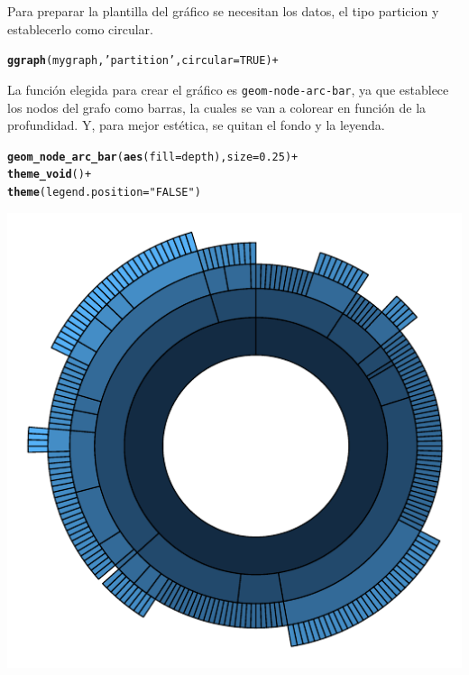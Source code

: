 \documentclass{article}\usepackage[]{graphicx}\usepackage[]{color}
\makeatletter
\def\maxwidth{ %
  \ifdim\Gin@nat@width>\linewidth
    \linewidth
  \else
    \Gin@nat@width
  \fi
}
\newcommand{\hlnum}[1]{\textcolor[rgb]{0.686,0.059,0.569}{#1}}%
\newcommand{\hlstr}[1]{\textcolor[rgb]{0.192,0.494,0.8}{#1}}%
\newcommand{\hlopt}[1]{\textcolor[rgb]{0,0,0}{#1}}%
\newcommand{\hlstd}[1]{\textcolor[rgb]{0.345,0.345,0.345}{#1}}%
\newcommand{\hlkwc}[1]{\textcolor[rgb]{0.333,0.667,0.333}{#1}}%
\newcommand{\hlkwd}[1]{\textcolor[rgb]{0.737,0.353,0.396}{\textbf{#1}}}%
\newenvironment{kframe}{%
 \def\at@end@of@kframe{}%
 \ifinner\ifhmode%
  \def\at@end@of@kframe{\end{minipage}}%
  \begin{minipage}{\columnwidth}%
 \fi\fi%
 \def\FrameCommand##1{\hskip\@totalleftmargin \hskip-\fboxsep
 \colorbox{shadecolor}{##1}\hskip-\fboxsep
     \hskip-\linewidth \hskip-\@totalleftmargin \hskip\columnwidth}%
 \MakeFramed {\advance\hsize-\width
   \@totalleftmargin\z@ \linewidth\hsize
   \@setminipage}}%
 {\par\unskip\endMakeFramed%
 \at@end@of@kframe}
\newenvironment{knitrout}{}{} %
\makeatother
\begin{document}
Para preparar la plantilla del gr\'afico se necesitan los datos, el tipo particion y establecerlo como circular.
\begin{knitrout}
\color{fgcolor}\begin{kframe}
\begin{alltt}
\hlkwd{ggraph}(mygraph, \hlstr{'partition'}, circular = TRUE) +
\end{alltt}
\end{kframe}
\end{knitrout}
La funci\'on elegida para crear el gr\'afico es \texttt{geom-node-arc-bar}, ya que establece los nodos del grafo como barras, la cuales se van a colorear en funci\'on de la profundidad. Y, para mejor est\'etica, se quitan el fondo y la leyenda.
\begin{knitrout}
\color{fgcolor}\begin{kframe}
\begin{alltt}
  \hlkwd{geom_node_arc_bar}\hlstd{(}\hlkwd{aes}\hlstd{(}\hlkwc{fill} \hlstd{= depth),} \hlkwc{size} \hlstd{=} \hlnum{0.25}\hlstd{)} \hlopt{+}
  \hlkwd{theme_void}\hlstd{()} \hlopt{+}
  \hlkwd{theme}\hlstd{(}\hlkwc{legend.position}\hlstd{=}\hlstr{"FALSE"}\hlstd{)}
\end{alltt}
\end{kframe}
\end{knitrout}
\begin{knitrout}
\color{fgcolor}

{\centering \includegraphics[width=\maxwidth]{figure/plot_ggraph_sol-1} 

}



\end{knitrout}
\end{document}
